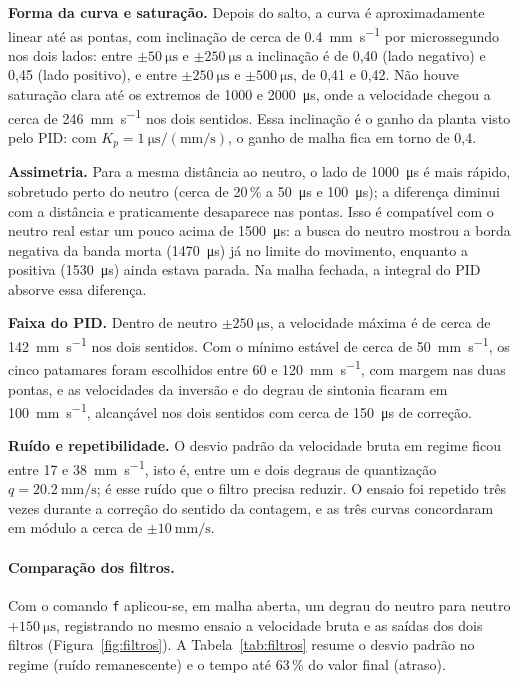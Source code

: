 \documentclass[12pt]{article}
\begin{document}
\textbf{Forma da curva e saturação.} Depois do salto, a curva é aproximadamente linear até as pontas, com inclinação de cerca de \SI{0,4}{\milli\meter\per\second} por microssegundo nos dois lados: entre $\pm\SI{50}{\micro\second}$ e $\pm\SI{250}{\micro\second}$ a inclinação é de 0,40 (lado negativo) e 0,45 (lado positivo), e entre $\pm\SI{250}{\micro\second}$ e $\pm\SI{500}{\micro\second}$, de 0,41 e 0,42. Não houve saturação clara até os extremos de 1000 e \SI{2000}{\micro\second}, onde a velocidade chegou a cerca de \SI{246}{\milli\meter\per\second} nos dois sentidos. Essa inclinação é o ganho da planta visto pelo PID: com $K_p = \SI{1}{\micro\second}/(\si{\milli\meter\per\second})$, o ganho de malha fica em torno de 0,4.

\textbf{Assimetria.} Para a mesma distância ao neutro, o lado de \SI{1000}{\micro\second} é mais rápido, sobretudo perto do neutro (cerca de 20\,\% a \SI{50}{\micro\second} e \SI{100}{\micro\second}); a diferença diminui com a distância e praticamente desaparece nas pontas. Isso é compatível com o neutro real estar um pouco acima de \SI{1500}{\micro\second}: a busca do neutro mostrou a borda negativa da banda morta (\SI{1470}{\micro\second}) já no limite do movimento, enquanto a positiva (\SI{1530}{\micro\second}) ainda estava parada. Na malha fechada, a integral do PID absorve essa diferença.

\textbf{Faixa do PID.} Dentro de neutro $\pm\SI{250}{\micro\second}$, a velocidade máxima é de cerca de \SI{142}{\milli\meter\per\second} nos dois sentidos. Com o mínimo estável de cerca de \SI{50}{\milli\meter\per\second}, os cinco patamares foram escolhidos entre 60 e \SI{120}{\milli\meter\per\second}, com margem nas duas pontas, e as velocidades da inversão e do degrau de sintonia ficaram em \SI{100}{\milli\meter\per\second}, alcançável nos dois sentidos com cerca de \SI{150}{\micro\second} de correção.

\textbf{Ruído e repetibilidade.} O desvio padrão da velocidade bruta em regime ficou entre 17 e \SI{38}{\milli\meter\per\second}, isto é, entre um e dois degraus de quantização $q = \SI{20,2}{\milli\meter\per\second}$; é esse ruído que o filtro precisa reduzir. O ensaio foi repetido três vezes durante a correção do sentido da contagem, e as três curvas concordaram em módulo a cerca de $\pm\SI{10}{\milli\meter\per\second}$.

\paragraph{Comparação dos filtros.} Com o comando \texttt{f} aplicou-se, em malha aberta, um degrau do neutro para neutro $+\SI{150}{\micro\second}$, registrando no mesmo ensaio a velocidade bruta e as saídas dos dois filtros (Figura~\ref{fig:filtros}). A Tabela~\ref{tab:filtros} resume o desvio padrão no regime (ruído remanescente) e o tempo até 63\,\% do valor final (atraso).
\end{document}
